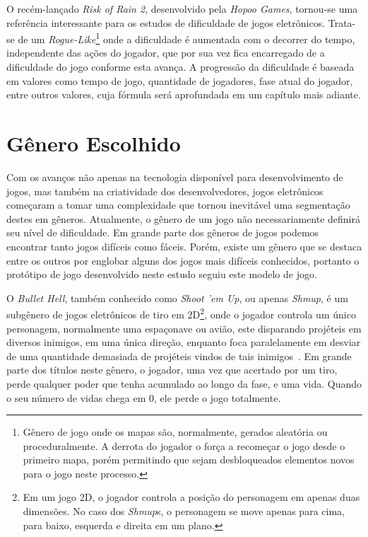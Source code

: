 O recém-lançado \textit{Risk of Rain 2}, desenvolvido pela \textit{Hopoo Games}, tornou-se uma referência interessante para os estudos de dificuldade de jogos eletrônicos. Trata-se de um \textit{Rogue-Like}\footnote{
    Gênero de jogo onde os mapas são, normalmente, gerados aleatória ou proceduralmente. A derrota do jogador o força a recomeçar o jogo desde o primeiro mapa, porém permitindo que sejam desbloqueados elementos novos para o jogo neste processo.
} onde a dificuldade é aumentada com o decorrer do tempo, independente das ações do jogador, que por sua vez fica encarregado de \textquotedbl{} a dificuldade do jogo conforme esta avança. A progressão da dificuldade é baseada em valores como tempo de jogo, quantidade de jogadores, fase atual do jogador, entre outros valores, cuja fórmula será aprofundada em um capítulo mais adiante.

\section{Gênero Escolhido}

Com os avanços não apenas na tecnologia disponível para desenvolvimento de jogos, mas também na criatividade dos desenvolvedores, jogos eletrônicos começaram a tomar uma complexidade que tornou inevitável uma segmentação destes em gêneros. Atualmente, o gênero de um jogo não necessariamente definirá seu nível de dificuldade. Em grande parte dos gêneros de jogos podemos encontrar tanto jogos difíceis como fáceis. Porém, existe um gênero que se destaca entre os outros por englobar alguns dos jogos mais difíceis conhecidos, portanto o protótipo de jogo desenvolvido neste estudo seguiu este modelo de jogo.

O \textit{Bullet Hell}, também conhecido como \textit{Shoot 'em Up}, ou apenas \textit{Shmup}, é um subgênero de jogos eletrônicos de tiro em 2D\footnote{
    Em um jogo 2D, o jogador controla a posição do personagem em apenas duas dimensões. No caso dos \textit{Shmup}s, o personagem se move apenas para cima, para baixo, esquerda e direita em um plano.
}, onde o jogador controla um único personagem, normalmente uma espaçonave ou avião, este disparando projéteis em diversos inimigos, em uma única direção, enquanto foca paralelamente em desviar de uma quantidade demasiada de projéteis vindos de tais inimigos~\citep{STG}. Em grande parte dos títulos neste gênero, o jogador, uma vez que acertado por um tiro, perde qualquer poder que tenha acumulado ao longo da fase, e uma vida. Quando o seu número de vidas chega em 0, ele perde o jogo totalmente.

